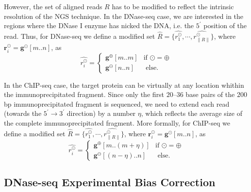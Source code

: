 However, the set of aligned reads $R$ has to be modified to reflect the intrinsic resolution of the NGS technique. In the DNase-seq case, we are interested in the regions where the DNase I enzyme has nicked the DNA, i.e. the ${5}^{\prime}$ position of the read. Thus, for DNase-seq we define a modified set $\hat{R} = \{ \hat{{r}_{1}^{\odot}}, \cdots, \hat{{r}_{\|R\|}^{\odot}} \}$, where $\mathbf{r}_{i}^{\odot} = \mathbf{g}^{\odot}[m..n]$, as
\begin{equation}
  \label{eq:R.dnase}
  \hat{{r}_{i}^{\odot}} = 
  \begin{cases}
    \mathbf{g}^{\oplus}[m..m] & \text{if } \odot = \oplus \\
    \mathbf{g}^{\ominus}[n..n] & \text{ else.}
  \end{cases}
\end{equation}

In the ChIP-seq case, the target protein can be virtually at any location whithin the immunoprecipitated fragment. Since only the first $20$--$36$ base pairs of the \approxy$200$ bp immunoprecipitated fragment is sequenced, we need to extend each read (towards the ${5}^{\prime} \rightarrow {3}^{\prime}$ direction) by a number $\eta$, which reflects the average size of the complete immunoprecipitated fragment. More formally, for ChIP-seq we define a modified set $\hat{R} = \{ \hat{{r}_{1}^{\odot}}, \cdots, \hat{{r}_{\|R\|}^{\odot}} \}$, where $\mathbf{r}_{i}^{\odot} = \mathbf{g}^{\odot}[m..n]$, as
\begin{equation}
  \label{eq:R.chip}
  \hat{{r}_{i}^{\odot}} = 
  \begin{cases}
    \mathbf{g}^{\oplus}[m..(m+\eta)] & \text{if } \odot = \oplus \\
    \mathbf{g}^{\ominus}[(n-\eta)..n] & \text{ else.}
  \end{cases}
\end{equation}

\subsection{DNase-seq Experimental Bias Correction}
\label{sec:experimental.bias.correction}

